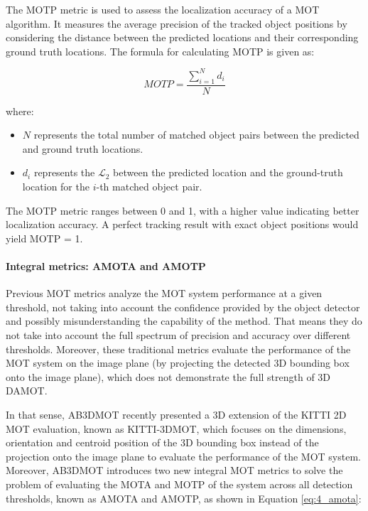 The \acf{MOTP} metric is used to assess the localization accuracy of a \ac{MOT} algorithm. It measures the average precision of the tracked object positions by considering the distance between the predicted locations and their corresponding ground truth locations. The formula for calculating \ac{MOTP} is given as:

\begin{equation}
	MOTP = \frac{{\sum_{{i=1}}^{{N}} d_i}}{{N}}
\end{equation}

where:
\begin{itemize}
	\item \textbf{\(N\)} represents the total number of matched object pairs between the predicted and ground truth locations.
	\item \textbf{\(d_i\)} represents the $\mathcal{L}_2$ between the predicted location and the ground-truth location for the \(i\)-th matched object pair.
\end{itemize}

The \ac{MOTP} metric ranges between 0 and 1, with a higher value indicating better localization accuracy. A perfect tracking result with exact object positions would yield \ac{MOTP} = 1.

\paragraph{Integral metrics: AMOTA and AMOTP}
\label{par:4_integral_metrics}

Previous \ac{MOT} metrics analyze the \ac{MOT} system performance at a given threshold, not taking into account the confidence provided by the object detector and possibly misunderstanding the capability of the method. That means they do not take into account the full spectrum of precision and accuracy over different thresholds. Moreover, these traditional metrics evaluate the performance of the \ac{MOT} system on the image plane (by projecting the detected 3D bounding box onto the image plane), which does not demonstrate the full strength of 3D \ac{DAMOT}. 

In that sense, AB3DMOT \cite{weng2019baseline} recently presented a 3D extension of the KITTI 2D MOT evaluation, known as KITTI-3DMOT, which focuses on the dimensions, orientation and centroid position of the 3D bounding box instead of the projection onto the image plane to evaluate the performance of the MOT system. Moreover, AB3DMOT introduces two new integral \ac{MOT} metrics to solve the problem of evaluating the \ac{MOTA} and \ac{MOTP} of the system across all detection thresholds, known as \ac{AMOTA} and \ac{AMOTP}, as shown in Equation \ref{eq:4_amota}:

